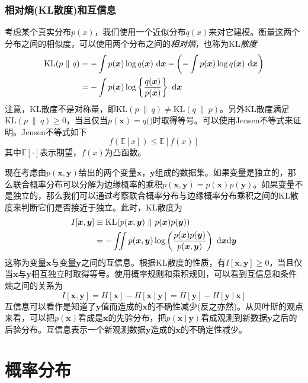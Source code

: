\documentclass[11pt]{ctexbook}
\begin{document}
\subsection{相对熵(KL散度)和互信息}
考虑某个真实分布$p(x)$，我们使用一个近似分布$q(x)$来对它建模。衡量这两个分布之间的相似度，可以使用两个分布之间的\emph{相对熵}，也称为KL\emph{散度}
\begin{align}
	\mathrm{KL}(p\ \|\ q) &= -\int p(\bm x)\log q(\bm x)\ \mathrm{d}\bm x -\left( -\int p(\bm x)\log q(\bm x)\ \mathrm{d}\bm x \right) \notag \\
						& = -\int p(\bm x)\log \left\{ \frac{q(\bm x)}{p(\bm x)} \right\}\ \mathrm{d}\bm x
\end{align}
注意，KL散度不是对称量，即$\mathrm{KL}(p\ \|\ q) \neq \mathrm{KL}(q\ \|\ p)$。另外KL散度满足$\mathrm{KL}(p\ \|\ q) \geq 0$，当且仅当$p(\bm x) = q(\bm)$时取得等号。可以使用Jensen不等式来证明。Jensen不等式如下
\begin{equation}
	f(\mathbb E[x]) \leq \mathbb E[f(x)]
\end{equation}
其中$\mathbb E[\cdot]$表示期望，$f(x)$为凸函数。


现在考虑由$p(\bm x, \bm y)$给出的两个变量$\bm x$，$\bm y$组成的数据集。如果变量是独立的，那么联合概率分布可以分解为边缘概率的乘积$p(\bm x, \bm y) = p(\bm x)p(\bm y)$。如果变量不是独立的，那么我们可以通过考察联合概率分布与边缘概率分布乘积之间的KL散度来判断它们是否接近于独立。此时，KL散度为
\begin{align}
	I[\bm x, \bm y] &\equiv \mathrm{KL}(p(\bm x, \bm y)\ \|\ p(\bm x)p(\bm y)) \notag \\
	&= -\iint p(\bm x, \bm y) \log \left(\frac{p(\bm x)p(\bm y)}{p(\bm x, \bm y)} \right) \ \mathrm{d}\bm x\mathrm{d}\bm y
\end{align}
这称为变量$\bm x$与变量$\bm y$之间的互信息。根据KL散度的性质，有$I[\bm x, \bm y] \geq 0$，当且仅当$\bm x$与$\bm y$相互独立时取得等号。使用概率规则和乘积规则，可以看到互信息和条件熵之间的关系为
\begin{equation}
	I[\bm x, \bm y] = H[\bm x] - H[\bm x\ |\ \bm y] = H[\bm y] - H[\bm y\ |\ \bm x]
\end{equation}
互信息可以看作是知道了$\bm y$值而造成的$\bm x$的不确性减少(反之亦然)。从贝叶斯的观点来看，可以把$p(\bm x)$看成是$\bm x$的先验分布，把$p(\bm x\ |\ \bm y)$看成观测到新数据$\bm y$之后的后验分布。互信息表示一个新观测数据$\bm y$造成的$\bm x$的不确定性减少。
\chapter{概率分布}
\end{document}
